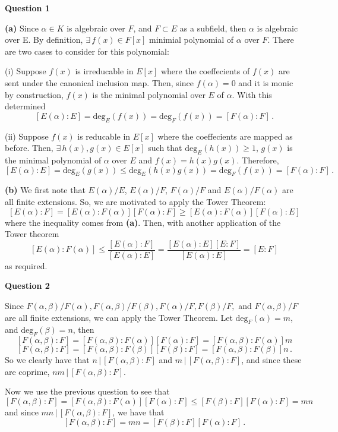 \documentclass[10pt]{article}
\begin{document}
\textbf{Question 1}

\textbf{(a)} Since $\alpha \in K$ is algebraic over $F$, and $F \subset E$ as a subfield, then $\alpha$ is algebraic over E. By definition, $\exists\, f(x)\in F[x]$ minimial polynomial of $\alpha$ over $F$. There are two cases to consider for this polynomial:

(i) Suppose $f(x)$ is irreducable in $E[x]$ where the coeffecients of $f(x)$ are sent under the canonical inclusion map. Then, since $f(\alpha) = 0$ and it is monic by construction, $f(x)$ is the minimal polynomial over $E$ of $\alpha$. With this determined
\[ [E(\alpha):E] = \text{deg}_{E}(f(x)) = \text{deg}_{F}(f(x)) = [F(\alpha):F] \,.\]

(ii) Suppose $f(x)$ is reducable in $E[x]$ where the coeffecients are mapped as before. Then, $\exists\, h(x),g(x)\in E[x]$ such that $\text{deg}_{E}(h(x)) \geq 1$, $g(x)$ is the minimal polynomial of $\alpha$ over $E$ and $f(x) = h(x)g(x)$. Therefore,
\[ [E(\alpha):E] = \text{deg}_{E}(g(x)) \leq \text{deg}_{E}(h(x)g(x)) = \text{deg}_{F}(f(x)) = [F(\alpha):F] \, .\]

\textbf{(b)} We first note that $E(\alpha)/E$, $E(\alpha)/F$, $F(\alpha)/F$ and $E(\alpha)/F(\alpha)$ are all finite extensions. So, we are motivated to apply the Tower Theorem:
\[ [E(\alpha):F] = [E(\alpha):F(\alpha)][F(\alpha):F] \geq [E(\alpha):F(\alpha)][F(\alpha):E] \]
where the inequality comes from \textbf{(a)}. Then, with another application of the Tower theorem
\[ [E(\alpha):F(\alpha)] \leq \frac{[E(\alpha):F]}{[E(\alpha):E]} = \frac{[E(\alpha):E][E:F]}{[E(\alpha):E]} = [E:F]\]
as required.

\newpage
\textbf{Question 2}

Since $F(\alpha,\beta)/F(\alpha),F(\alpha,\beta)/F(\beta),F(\alpha)/F,F(\beta)/F,$ and $F(\alpha,\beta)/F$ are all finite extensions, we can apply the Tower Theorem. Let $\text{deg}_{F}(\alpha) = m$, and $\text{deg}_{F}(\beta) = n$, then
\[ [F(\alpha,\beta):F] = [F(\alpha,\beta):F(\alpha)][F(\alpha):F] = [F(\alpha,\beta):F(\alpha)]m \]
\[ [F(\alpha,\beta):F] = [F(\alpha,\beta):F(\beta)][F(\beta):F] = [F(\alpha,\beta):F(\beta)]n \,.\]
So we clearly have that $n \, |\, [F(\alpha,\beta):F]$ and $m \, |\, [F(\alpha,\beta):F]$, and since these are coprime, $nm \, | \,[F(\alpha,\beta):F]$.

Now we use the previous question to see that
\[ [F(\alpha,\beta):F] = [F(\alpha,\beta):F(\alpha)][F(\alpha):F] \leq [F(\beta):F][F(\alpha):F] = mn \]
and since $mn \, | \, [F(\alpha,\beta):F]$, we have that
\[ [F(\alpha,\beta):F] = mn = [F(\beta):F][F(\alpha):F] \, .\]
\end{document}
